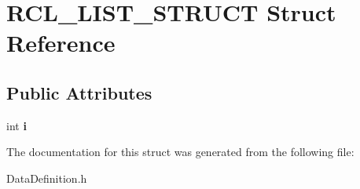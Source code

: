 \hypertarget{structRCL__LIST__STRUCT}{\section{R\-C\-L\-\_\-\-L\-I\-S\-T\-\_\-\-S\-T\-R\-U\-C\-T Struct Reference}
\label{structRCL__LIST__STRUCT}
}
\subsection*{Public Attributes}
\begin{DoxyCompactItemize}
\item 
\hypertarget{structRCL__LIST__STRUCT_a1fe9da973a851dad04eb6b0272b35adb}{int {\bfseries i}}\label{structRCL__LIST__STRUCT_a1fe9da973a851dad04eb6b0272b35adb}

\end{DoxyCompactItemize}


The documentation for this struct was generated from the following file\-:\begin{DoxyCompactItemize}
\item 
Data\-Definition.\-h\end{DoxyCompactItemize}

